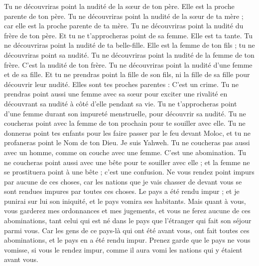 \begin{multicols}{2}
Tu ne découvriras point la nudité de la sœur de ton père. Elle est la proche parente de ton père.
Tu ne découvriras point la nudité de la sœur de ta mère ; car elle est la proche parente de ta mère.
Tu ne découvriras point la nudité du frère de ton père. Et tu ne t'approcheras point de sa femme. Elle est ta tante.
Tu ne découvriras point la nudité de ta belle-fille. Elle est la femme de ton fils ; tu ne découvriras point sa nudité.
Tu ne découvriras point la nudité de la femme de ton frère. C'est la nudité de ton frère.
Tu ne découvriras point la nudité d'une femme et de sa fille. Et tu ne prendras point la fille de son fils, ni la fille de sa fille pour découvrir leur nudité. Elles sont tes proches parentes : C'est un crime.
Tu ne prendras point aussi une femme avec sa sœur pour exciter une rivalité en découvrant sa nudité à côté d'elle pendant sa vie.
Tu ne t'approcheras point d'une femme durant son impureté menstruelle, pour découvrir sa nudité.
Tu ne coucheras point avec la femme de ton prochain pour te souiller avec elle.
Tu ne donneras point tes enfants pour les faire passer par le feu devant Moloc, et tu ne profaneras point le Nom de ton Dieu. Je suis Yahweh.
Tu ne coucheras pas aussi avec un homme, comme on couche avec une femme. C'est une abomination.
Tu ne coucheras point aussi avec une bête pour te souiller avec elle ; et la femme ne se prostituera point à une bête ; c'est une confusion.
Ne vous rendez point impurs par aucune de ces choses, car les nations que je vais chasser de devant vous se sont rendues impures par toutes ces choses.
Le pays a été rendu impur ; et je punirai sur lui son iniquité, et le pays vomira ses habitants.
Mais quant à vous, vous garderez mes ordonnances et mes jugements, et vous ne ferez aucune de ces abominations, tant celui qui est né dans le pays que l'étranger qui fait son séjour parmi vous.
Car les gens de ce pays-là qui ont été avant vous, ont fait toutes ces abominations, et le pays en a été rendu impur.
Prenez garde que le pays ne vous vomisse, si vous le rendez impur, comme il aura vomi les nations qui y étaient avant vous.

\end{multicols}
